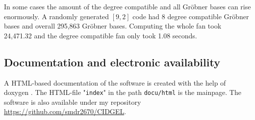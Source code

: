  In some cases the amount of the degree compatible and all Gröbner bases can rise enormously. A randomly generated $[9,2]$ code had 8 degree compatible Gröbner bases and overall 295,863 Gröbner bases. 
 Computing the whole fan took 24,471.32 and the degree compatible fan only took 1.08 seconds. 
    



\subsection{Documentation and electronic availability}
\label{subsec:docu}
A HTML-based documentation of the software is created with the help of doxygen \cite{doxygen}. The HTML-file "\texttt{index}" in the path \texttt{docu/html} is the mainpage.
The software is also available under my repository \\ \url{https://github.com/smdr2670/CIDGEL}.


\newpage

